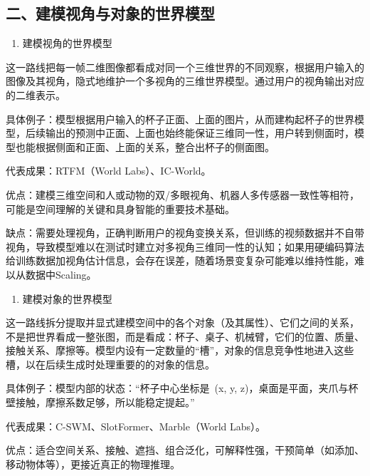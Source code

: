 \hypertarget{ux4e8cux5efaux6a21ux89c6ux89d2ux4e0eux5bf9ux8c61ux7684ux4e16ux754cux6a21ux578b}{%
\subsection{二、建模视角与对象的世界模型}\label{ux4e8cux5efaux6a21ux89c6ux89d2ux4e0eux5bf9ux8c61ux7684ux4e16ux754cux6a21ux578b}}

\begin{enumerate}
\def\labelenumi{\arabic{enumi}.}
\tightlist
\item
  建模视角的世界模型
\end{enumerate}

这一路线把每一帧二维图像都看成对同一个三维世界的不同观察，根据用户输入的图像及其视角，隐式地维护一个多视角的三维世界模型。通过用户的视角输出对应的二维表示。

具体例子：模型根据用户输入的杯子正面、上面的图片，从而建构起杯子的世界模型，后续输出的预测中正面、上面也始终能保证三维同一性，用户转到侧面时，模型也能根据侧面和正面、上面的关系，整合出杯子的侧面图。

代表成果：RTFM（World Labs）、IC-World。

优点：建模三维空间和人或动物的双/多眼视角、机器人多传感器一致性等相符，可能是空间理解的关键和具身智能的重要技术基础。

缺点：需要处理视角，正确判断用户的视角变换关系，但训练的视频数据并不自带视角，导致模型难以在测试时建立对多视角三维同一性的认知；如果用硬编码算法给训练数据加视角估计信息，会存在误差，随着场景变复杂可能难以维持性能，难以从数据中Scaling。

\begin{enumerate}
\def\labelenumi{\arabic{enumi}.}
\setcounter{enumi}{1}
\tightlist
\item
  建模对象的世界模型
\end{enumerate}

这一路线拆分提取并显式建模空间中的各个对象（及其属性）、它们之间的关系，不是把世界看成一整张图，而是看成：杯子、桌子、机械臂，它们的位置、质量、接触关系、摩擦等。模型内设有一定数量的``槽''，对象的信息竞争性地进入这些槽，以在后续生成时处理重要的的对象的信息。

具体例子：模型内部的状态：``杯子中心坐标是~(x, y, z)，桌面是平面，夹爪与杯壁接触，摩擦系数足够，所以能稳定提起。''

代表成果：C-SWM、SlotFormer、Marble（World Labs）。

优点：适合空间关系、接触、遮挡、组合泛化，可解释性强，干预简单（如添加、移动物体等），更接近真正的物理推理。

